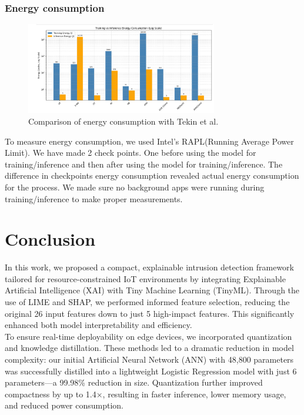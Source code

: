 \documentclass[conference,letterpaper]{IEEEtran}
\begin{document}
\subsubsection{Energy consumption}
\begin{figure}[H]
    \centering
    \includegraphics[width=\linewidth,height=4cm]{energy-2.png}
    \caption{Comparison of energy consumption with Tekin et al. }
    \label{fig:inferenceT}
\end{figure}
To measure energy consumption, we used Intel's RAPL(Running Average Power Limit). We have made 2 check points. One before using the model for training/inference and then after using the model for training/inference. The difference in checkpoints energy consumption revealed actual energy consumption for the process. We made sure no background apps were running during training/inference to make proper measurements.

\section{Conclusion}
In this work, we proposed a compact, explainable intrusion detection framework tailored for resource-constrained IoT environments by integrating Explainable Artificial Intelligence (XAI) with Tiny Machine Learning (TinyML). Through the use of LIME and SHAP, we performed informed feature selection, reducing the original 26 input features down to just 5 high-impact features. This significantly enhanced both model interpretability and efficiency.
\\

To ensure real-time deployability on edge devices, we incorporated quantization and knowledge distillation. These methods led to a dramatic reduction in model complexity: our initial Artificial Neural Network (ANN) with 48,800 parameters was successfully distilled into a lightweight Logistic Regression model with just 6 parameters—a 99.98\% reduction in size. Quantization further improved compactness by up to 1.4×, resulting in faster inference, lower memory usage, and reduced power consumption.
\end{document}
